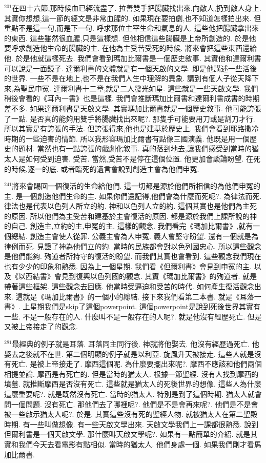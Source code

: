 \documentclass{book}
\begin{document}
$^{201}$在四十六節,那時候血已經流盡了.
拉善雙手把腸臟找出來,向敵人,扔到敵人身上.
其實你想想,這一節的經文是非常血腥的.
如果現在要拍劇,也不知道怎樣拍出來.
但重點不是這一句,而是下一句.
呼求那位主宰生命和氣息的人.
這些他把腸臟拿出來的東西.
這些雖然很血腥,只是這樣想.
但他相信這些腸臟是上帝所創造的.
於是他要呼求創造他生命的腸臟的主.
在他為主受苦受死的時候.
將來會把這些東西還給他.
於是他就這樣死去.
我們會看到瑪加比爾書是一個歷史敘事.
其實他和達爾利書可以說是一面鏡子.
達爾利書的文體就是有一個天啟的文學.
即是他講述一些活後的世界.
一些不是在地上,也不是在我們人生中理解的異象.
講到有個人子從天降下來,為聖民申冤.
達爾利書十二章,就是二人發光如星.
這些就是一些天啟文學.
我們稍後會看的《耳內一書》也是這樣.
我們會推斷瑪加比爾書和達爾利書成書的時期差不多.
如果達爾利書是天啟文學.
其實瑪加比爾書就是一個歷史敘事.
他可能誇張了一點.
是否真的能夠用雙手將腸臟找出來呢?.
那隻手可能要用刀或是割刀才行.
所以其實是有誇張的手法.
但誇張得來,他也是建基於歷史上.
我們會看到耶路撒冷時期的一些迫害的情節.
所以我形容瑪加比爾書有點像三國演義.
他既是用一個歷史的題材.
當然也有一點誇張的戲劇化敘事.
真的落到地去,讓我們感受到當時的猶太人是如何受到迫害.
受苦.
當然,受苦不是停在這個位置.
他更加會談論盼望.
在死的時候,逐一的底.
或者臨死的遺言會說到創造主會為他們申冤.

$^{241}$將來會賜回一個復活的生命給他們.
這一切都是源於他們所相信的為他們申冤的主.
是一個創造他們生命的主.
如果你們還記得,他們會為什麼而死呢?.
為律法而死.
律法也是代表以色列人所立的約.
神和以色列人立的約.
這個其實也是他們為主死的原因.
所以他們為主受苦和建基於主會復活的原因.
都是源於我們上課所說的神的自己.
創造主,立約的主,申冤的主.
這樣的觀念.
我們看完《瑪加比爾書》,就有一個總結.
創造主會使人從罪.
公義主會為人申冤.
義人會堅守盼望.
還有一個就是為律例而死.
見證了神為他們立的約.
當時的民族都會對以色列國忠心.
所以這些觀念是他們能夠.
殉道者所持守的復活的盼望.
而我們其實也會看到.
這些觀念我們現在也有少少的印象和熟悉.
因為上一個星期.
我們看《但爾利書》會見到申冤的主.
以及《以西結書》會見到復興以色列國的觀念.
其實《瑪加比爾書》的殉道者.
就是帶著這些框架.
這些觀念去回應.
他當時受逼迫和受苦的時代.
如何產生復活觀念出來.
這就是《瑪加比爾書》的一個小的總結.
接下來我們看第二本書.
就是《耳落一書》.
上星期我們是skip了這個powerpoint.
這個powerpoint是說到死後世界其實有一些.
不是一般存在的人.
什麼叫不是一般存在的人呢?.
就是他沒有經歷死亡.
但是又被上帝接走了的觀念.

$^{281}$最經典的例子就是耳落.
耳落同主同行後.
神就將他娶去.
他沒有經歷過死亡.
他娶去之後就不在世.
第二個明顯的例子就是以利亞.
旋風升天被接走.
這些人就是沒有死亡.
是被上帝接走了.
摩西這個呢.
為什麼要擺出來呢?.
摩西不應該和他們兩個相提並論.
摩西是有死亡的.
但是當時的猶太人.
根據一節聖經.
沒有人找到摩西的墳墓.
就推斷摩西是否沒有死亡.
這些就是猶太人的死後世界的想像.
這些人為什麼這麼重要呢?.
就是既然沒有死亡.
當時的猶太人.
特別是到了這個時期.
猶太人就會問一個問題.
沒有死亡.
那他們去了哪裡呢?.
他們是不是會再來呢?.
他們是不是會被一些啟示猶太人呢?.
於是.
其實這些沒有死的聖經人物.
就被猶太人在第二聖殿時期.
有一些叫做想像.
有一些天啟文學出來.
天啟文學我們上一課都很熟悉.
說到但爾利書是一個天啟文學.
那什麼叫天啟文學呢?.
如果有一點簡單的介紹.
就是其實和我們今天去看電影有點相似.
當時的猶太人.
他們身處一個.
如果我們剛才看馬加比爾書.
\end{document}
